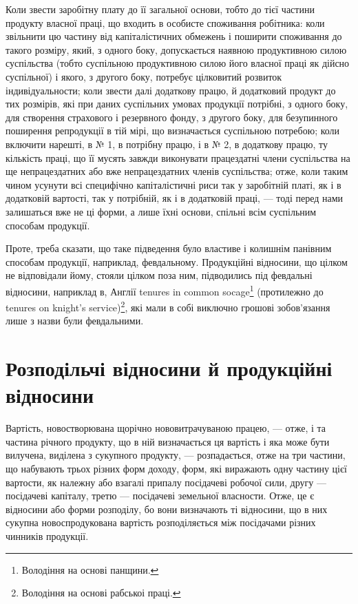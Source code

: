 
Коли звести заробітну плату до її загальної основи, тобто до тієї частини
продукту власної праці, що входить в особисте споживання робітника: коли
звільнити цю частину від капіталістичних обмежень і поширити споживання до
такого розміру, який, з одного боку, допускається наявною продуктивною силою
суспільства (тобто суспільною продуктивною силою його власної праці як дійсно
суспільної) і якого, з другого боку, потребує цілковитий розвиток індивідуальности; коли звести далі
додаткову працю, й додатковий продукт до тих розмірів,
які при даних суспільних умовах продукції потрібні, з одного боку, для створення
страхового і резервного фонду, з другого боку, для безупинного поширення
репродукції в тій мірі, що визначається суспільною потребою; коли включити
нарешті, в № 1, в потрібну працю, і в № 2, в додаткову працю, ту кількість
праці, що її мусять завжди виконувати працездатні члени суспільства на ще
непрацездатних або вже непрацездатних членів суспільства; отже, коли таким
чином усунути всі специфічно капіталістичні риси так у заробітній платі, як і в
додатковій вартості, так у потрібній, як і в додатковій праці, — тоді перед
нами залишаться вже не ці форми, а лише їхні основи, спільні всім суспільним
способам продукції.

Проте, треба сказати, що таке підведення було властиве і колишнім панівним
способам продукції, наприклад, февдальному. Продукційні відносини, що
цілком не відповідали йому, стояли цілком поза ним, підводились під февдальні
відносини, наприклад в, Англії tenures in common socage\footnote*{
Володіння на основі панщини. 
} (протилежно до tenures
on knight’s service)\footnote*{
Володіння на основі рабськоі праці. 
}, які мали в собі виключно грошові зобов’язання
лише з назви були февдальними.

\section{Розподільчі відносини й продукційні відносини}

Вартість, новостворювана щорічно нововитрачуваною працею, — отже, і та
частина річного продукту, що в ній визначається ця вартість і яка може бути
вилучена, виділена з сукупного продукту, — розпадається, отже на три частини,
що набувають трьох різних форм доходу, форм, які виражають одну частину
цієї вартости, як належну або взагалі припалу посідачеві робочої
сили, другу — посідачеві капіталу, третю — посідачеві земельної власности.
Отже, це є відносини або форми розподілу, бо вони визначають ті відносини,
що в них сукупна новоспродукована вартість розподіляється між посідачами
різних чинників продукції.

